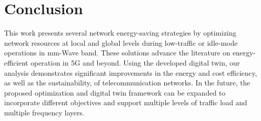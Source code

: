 \section{Conclusion}
\label{sec:conclusion}
\vspace{-2pt}
This work presents several network energy-saving strategies by optimizing network resources at local and global levels during low-traffic or idle-mode operations in mm-Wave band. These solutions advance the literature on energy-efficient operation in 5G and beyond. Using the developed digital twin, our analysis demonstrates significant improvements in the energy and cost efficiency, as well as the sustainability, of telecommunication networks.
In the future, the proposed optimization and digital twin framework can be expanded to incorporate different objectives and support multiple levels of traffic load and multiple frequency layers.